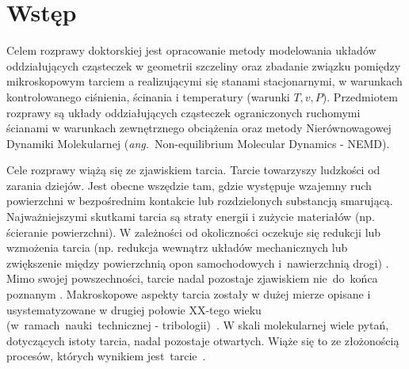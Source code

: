 \documentclass[12pt,a4paper,openright]{report} %
\begin{document}
\chapter{Wstęp}
%
Celem rozprawy doktorskiej jest opracowanie metody modelowania układów oddziałujących cząsteczek w geometrii szczeliny oraz zbadanie związku pomiędzy mikroskopowym tarciem a realizującymi się stanami stacjonarnymi, w warunkach kontrolowanego ciśnienia, ścinania i temperatury (warunki $T, v, P$).
Przedmiotem rozprawy są układy oddziałujących cząsteczek ograniczonych ruchomymi ścianami w warunkach zewnętrznego obciążenia oraz metody Nierównowagowej Dynamiki Molekularnej (\textit{ang.}~Non-equilibrium Molecular Dynamics - NEMD).

Cele rozprawy wiążą się ze zjawiskiem tarcia. Tarcie towarzyszy ludzkości od zarania dziejów. Jest obecne wszędzie tam, gdzie występuje wzajemny ruch powierzchni w bezpośrednim kontakcie lub rozdzielonych substancją smarującą. Najważniejszymi skutkami tarcia są straty energii i zużycie materiałów (np. ścieranie powierzchni). W zależności od okoliczności oczekuje się redukcji lub wzmożenia tarcia (np. redukcja wewnątrz układów mechanicznych lub zwiększenie między powierzchnią opon samochodowych i~nawierzchnią drogi) \cite{Hebda}. 
Mimo swojej powszechności, tarcie nadal pozostaje zjawiskiem nie~do~końca poznanym \cite{Persson2000, SpringerHandbook, Krim2002}. Makroskopowe aspekty tarcia zostały w dużej mierze opisane i usystematyzowane w drugiej połowie XX-tego wieku (w~ramach~nauki~technicznej - tribologii)~\cite{Hebda, Janecki}. W skali molekularnej wiele pytań, dotyczących istoty tarcia, nadal pozostaje otwartych. Wiąże się to ze złożonością procesów, których wynikiem \linebreak jest~tarcie~\cite{Dieriagin}.
\end{document}
